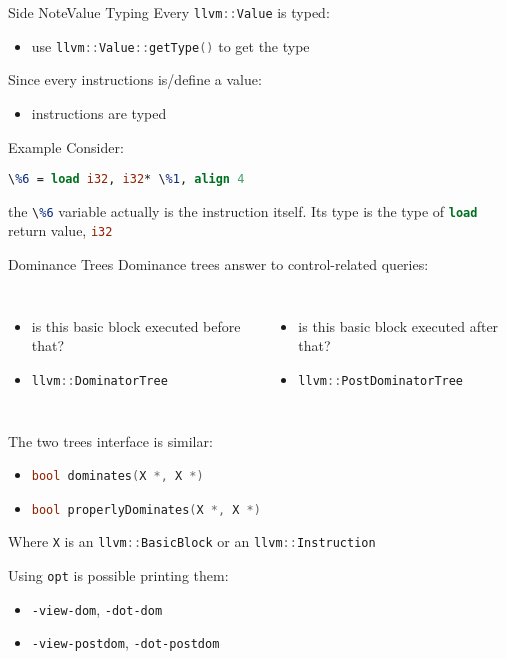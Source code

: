 \documentclass[10pt,mathserif]{beamer}
\newcommand{\cppinline}[1]{\lstinline[language=C++]!#1!}
\newcommand{\llvminline}[1]{\lstinline[language=LLVM]!#1!}
\begin{document}
\begin{frame}{Side Note}{Value Typing}
Every \cppinline{llvm::Value} is typed:

\begin{itemize}
\item use \cppinline{llvm::Value::getType()} to get the type
\end{itemize}

Since every instructions is/define a value:

\begin{itemize}
\item instructions are typed
\end{itemize}

\begin{block}{Example}
Consider:

\centering
\llvminline{\%6 = load i32, i32* \%1, align 4}

\flushleft
the \llvminline{\%6} variable actually is the instruction itself. Its type is
the type of \llvminline{load} return value, \llvminline{i32}
\end{block}
\end{frame}

\begin{frame}{Dominance Trees}
Dominance trees answer to control-related queries:

\begin{columns}[t]
\begin{itemize}
\item is this basic block executed before that?
\item \cppinline{llvm::DominatorTree}
\end{itemize}

\begin{itemize}
\item is this basic block executed after that?
\item \cppinline{llvm::PostDominatorTree}
\end{itemize}
\end{columns}

\bigskip
The two trees interface is similar:

\begin{itemize}
\item \cppinline{bool dominates(X *, X *)}
\item \cppinline{bool properlyDominates(X *, X *)}
\end{itemize}

Where \cppinline{X} is an \cppinline{llvm::BasicBlock} or an
\cppinline{llvm::Instruction}

\bigskip
Using \texttt{opt} is possible printing them:

\begin{itemize}
\item \texttt{-view-dom}, \texttt{-dot-dom}
\item \texttt{-view-postdom}, \texttt{-dot-postdom}
\end{itemize}
\end{frame}
\end{document}
